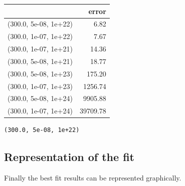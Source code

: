 \documentclass[11pt]{article}
\makeatletter
\newcommand{\boxspacing}{\kern\kvtcb@left@rule\kern\kvtcb@boxsep}
\newcommand{\prompt}[4]{
        \ttfamily\llap{{\color{#2}[#3]:\hspace{3pt}#4}}\vspace{-\baselineskip}
    }
\makeatother
\begin{document}
    
    \begin{center}
    {\begin{tabular}{lr}
\toprule
{} &     error \\
\midrule
(300.0, 5e-08, 1e+22) &      6.82 \\
(300.0, 1e-07, 1e+22) &      7.67 \\
(300.0, 1e-07, 1e+21) &     14.36 \\
(300.0, 5e-08, 1e+21) &     18.77 \\
(300.0, 5e-08, 1e+23) &    175.20 \\
(300.0, 1e-07, 1e+23) &   1256.74 \\
(300.0, 5e-08, 1e+24) &   9905.88 \\
(300.0, 1e-07, 1e+24) &  39709.78 \\
\bottomrule
\end{tabular}
}
    \end{center}
    

    
            \begin{tcolorbox}[breakable, size=fbox, boxrule=.5pt, pad at break*=1mm, opacityfill=0]
\prompt{Out}{outcolor}{50}{\boxspacing}
\begin{Verbatim}[commandchars=\\\{\}]
(300.0, 5e-08, 1e+22)
\end{Verbatim}
\end{tcolorbox}
        
    \hypertarget{representation-of-the-fit}{%
\subsection{Representation of the fit}\label{representation-of-the-fit}}

Finally the best fit results can be represented graphically.
\end{document}
